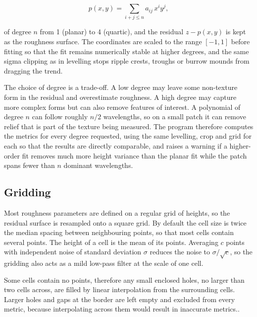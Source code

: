 
\begin{equation}
	p(x, y) = \sum_{i + j \le n} a_{ij}\, x^i y^j ,
\end{equation}

of degree $n$ from 1 (planar) to 4 (quartic), and the residual $z - p(x, y)$ is kept as the roughness surface. The coordinates are scaled to the range $[-1, 1]$ before fitting so that the fit remains numerically stable at higher degrees, and the same sigma clipping as in levelling stops ripple crests, troughs or burrow mounds from dragging the trend.

The choice of degree is a trade-off. A low degree may leave some non-texture form in the residual and overestimate roughness. A high degree may capture more complex forms but can also remove features of interest. A polynomial of degree $n$ can follow roughly $n/2$ wavelengths, so on a small patch it can remove relief that is part of the texture being measured. The program therefore computes the metrics for every degree requested, using the same levelling, crop and grid for each so that the results are directly comparable, and raises a warning if a higher-order fit removes much more height variance than the planar fit while the patch spans fewer than $n$ dominant wavelengths. 

\subsection{Gridding}

Most roughness parameters are defined on a regular grid of heights, so the residual surface is resampled onto a square grid. By default the cell size is twice the median spacing between neighbouring points, so that most cells contain several points. The height of a cell is the mean of its points. Averaging $c$ points with independent noise of standard deviation $\sigma$ reduces the noise to $\sigma/\sqrt{c}$, so the gridding also acts as a mild low-pass filter at the scale of one cell.

Some cells contain no points, therefore any small enclosed holes, no larger than two cells across, are filled by linear interpolation from the surrounding cells. Larger holes and gaps at the border are left empty and excluded from every metric, because interpolating across them would result in inaccurate metrics..

